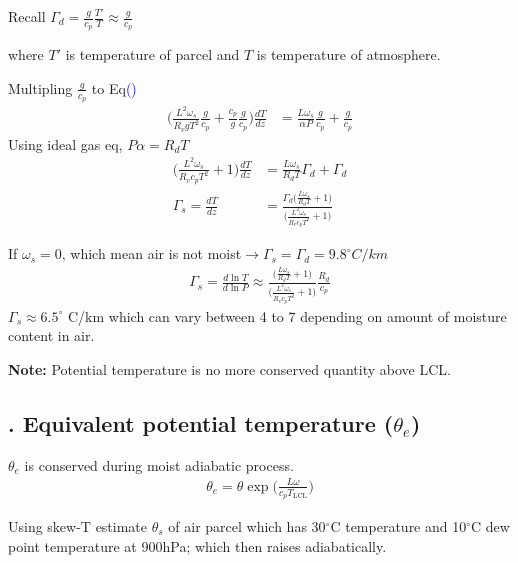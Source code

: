 \documentclass[fleqn,10pt]{SelfArx} %
\newcommand{\myeqref}[1]{\textcolor{blue}{\textup{(\getrefnumber{#1})}}}
\begin{document}
Recall $\Gamma_d=\frac{g}{c_p}\frac{T'}{T} \approx \frac{g}{c_p}$

where $T'$ is temperature of parcel and $T$ is temperature of atmosphere.

Multipling $\frac{g}{c_p}$ to Eq\myeqref{eq:lapse_rate}
\begin{align}
    \Big(\frac{L^2\omega_s}{R_v g T^2}\frac{g}{c_p} + \frac{c_p}{g}\frac{g}{c_p} \Big)\frac{dT}{dz} &= \frac{L\omega_s}{\alpha P}\frac{g}{c_p} + \frac{g}{c_p}
\end{align}
Using ideal gas eq, $P\alpha = R_dT$
\begin{align}
    \Big(\frac{L^2\omega_s}{R_v c_p T^2} + 1\Big)\frac{dT}{dz} &= \frac{L\omega_s}{R_d T}\Gamma_d + \Gamma_d \\
   \Gamma_s = \frac{dT}{dz} &= \frac{\Gamma_d \Big(\frac{L\omega_s}{R_d T} + 1\Big)}{\Big(\frac{L^2\omega_s}{R_v c_p T^2} + 1\Big)}
\end{align}

If $\omega_s=0$, which mean air is not moist$\rightarrow$$\Gamma_s=\Gamma_d=9.8^\circ C/km$
\begin{align}
    \Gamma_s = \frac{d\ln T}{d\ln P} \approx \frac{\Big(\frac{L\omega_s}{R_dT} + 1\Big)}{\Big(\frac{L^2\omega_s}{R_v c_p T^2} + 1\Big)}\frac{R_d}{c_p}
\end{align}
$\Gamma_s \approx 6.5^\circ$ C/km which can vary between 4 to 7 depending on amount of moisture content in air.

\textbf{Note:} Potential temperature is no more conserved quantity above LCL. 

\subsection{. Equivalent potential temperature ($\theta_e$)}
$\theta_e$ is conserved during moist adiabatic process.
\begin{align}
    \theta_e = \theta \exp\Big(\frac{L\omega}{c_p T_{\text{LCL}}}\Big)
\end{align}

\begin{question}[\label:22.1]{Using skew-T estimate $\theta_s$ of air parcel which has 30$^\circ$C temperature and 10$^\circ$C dew point temperature at 900hPa; which then raises adiabatically.}
    \Rightarrow {}
\end{question}
\clearpage
\end{document}

